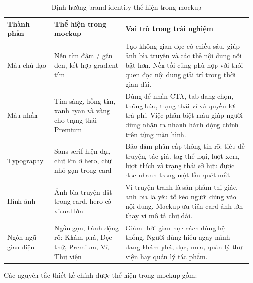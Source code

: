 \begin{table}[H]
\centering
\caption{Định hướng brand identity thể hiện trong mockup}
\label{tab:comicflow-brand-identity-real}
\renewcommand{\arraystretch}{1.25}
\small
\begin{tabular}{|L{3.0cm}|L{4.3cm}|L{6.4cm}|}
\hline
\textbf{Thành phần} & \textbf{Thể hiện trong mockup} & \textbf{Vai trò trong trải nghiệm} \\
\hline
Màu chủ đạo
& Nền tím đậm / gần đen, kết hợp gradient tím
& Tạo không gian đọc có chiều sâu, giúp ảnh bìa truyện và các thẻ nội dung nổi bật hơn. Nền tối cũng phù hợp với thói quen đọc nội dung giải trí trong thời gian dài. \\
\hline
Màu nhấn
& Tím sáng, hồng tím, xanh cyan và vàng cho trạng thái Premium
& Dùng để nhấn CTA, tab đang chọn, thông báo, trạng thái ví và quyền lợi trả phí. Việc phân biệt màu giúp người dùng nhận ra nhanh hành động chính trên từng màn hình. \\
\hline
Typography
& Sans-serif hiện đại, chữ lớn ở hero, chữ nhỏ gọn trong card
& Bảo đảm phân cấp thông tin rõ: tiêu đề truyện, tác giả, tag thể loại, lượt xem, lượt thích và trạng thái sở hữu được đọc nhanh trong một lần quét mắt. \\
\hline
Hình ảnh
& Ảnh bìa truyện đặt trong card, hero có visual lớn
& Vì truyện tranh là sản phẩm thị giác, ảnh bìa là yếu tố kéo người dùng vào nội dung. Mockup ưu tiên card ảnh lớn thay vì mô tả chữ dài. \\
\hline
Ngôn ngữ giao diện
& Ngắn gọn, hành động rõ: Khám phá, Đọc thử, Premium, Ví, Thư viện
& Giảm thời gian học cách dùng hệ thống. Người dùng hiểu ngay mình đang khám phá, đọc, mua, quản lý thư viện hay quản lý tác phẩm. \\
\hline
\end{tabular}
\end{table}

Các nguyên tắc thiết kế chính được thể hiện trong mockup gồm:

